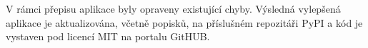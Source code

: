 \documentclass[%
  12pt,       				%
  a4paper,    				%
	unicode,						%
]{report}				    	%
\begin{document}
V rámci přepisu aplikace byly opraveny existující chyby. Výsledná vylepšená aplikace je aktualizována, včetně popisků, na příslušném repozitáři PyPI a kód je vystaven pod licencí MIT na portalu GitHUB.\\


\vytvorprohlaseni

\vytvorpodekovani

\vytvorpodekovaniSIX

\obsah

\seznamobrazku


\lstlistoflistings

\cleardoublepage\pagestyle{plain}   %










%







%

\end{document}
